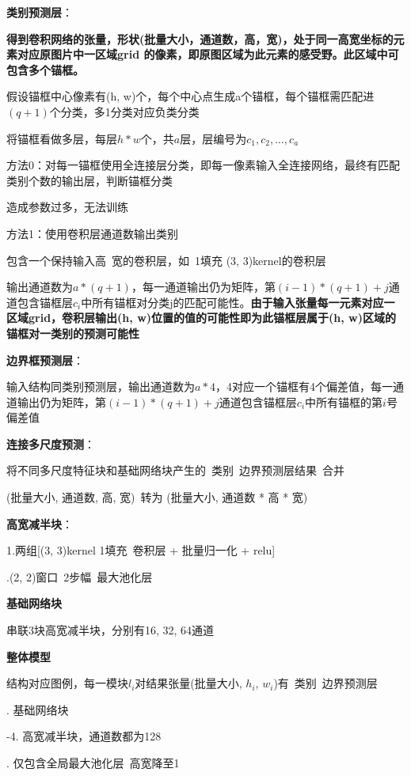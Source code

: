 \documentclass[UTF8]{ctexart}
\begin{document}
  \textbf{类别预测层}：

  \quad \textbf{得到卷积网络的张量，形状(批量大小，通道数，高，宽)，处于同一高宽坐标的元素对应原图片中一区域grid 的像素，即原图区域为此元素的感受野。此区域中可包含多个锚框。}
    
  \quad 假设锚框中心像素有(h, w)个，每个中心点生成a个锚框，每个锚框需匹配进$(q+1)$个分类，多1分类对应负类分类

  \quad \quad 将锚框看做多层，每层$h*w$个，共$a$层，层编号为$c_1, c_2, ..., c_a$

  \quad 方法0：对每一锚框使用全连接层分类，即每一像素输入全连接网络，最终有匹配类别个数的输出层，判断锚框分类

  \quad \quad 造成参数过多，无法训练

  \quad 方法1：使用卷积层通道数输出类别

  \quad \quad 包含一个保持输入高\ 宽的卷积层，如\ 1填充 (3, 3)kernel的卷积层

  \quad \quad 输出通道数为$a * (q+1)$，每一通道输出仍为矩阵，第$(i-1)*(q+1) + j$通道包含锚框层$c_i$中所有锚框对分类j的匹配可能性。\textbf{由于输入张量每一元素对应一区域grid，卷积层输出(h, w)位置的值的可能性即为此锚框层属于(h, w)区域的锚框对一类别的预测可能性}

  \textbf{边界框预测层}：

  \quad 输入结构同类别预测层，输出通道数为$a * 4$，4对应一个锚框有4个偏差值，每一通道输出仍为矩阵，第$(i-1)*(q+1) + j$通道包含锚框层$c_i$中所有锚框的第$i$号偏差值

  \textbf{连接多尺度预测}：

  \quad 将不同多尺度特征块和基础网络块产生的\ 类别\ 边界预测层结果\ 合并
  
  \quad (批量大小, 通道数, 高, 宽)\ 转为 (批量大小, 通道数 * 高 * 宽)
  
  \textbf{高宽减半块}：

  \quad 1.两组[(3, 3)kernel 1填充\ 卷积层 + 批量归一化 + relu]
  
  .(2, 2)窗口\ 2步幅\ 最大池化层

  \textbf{基础网络块}

  串联3块高宽减半块，分别有16, 32, 64通道

  \textbf{整体模型}
  
  \quad 结构对应图例，每一模块$l_i$对结果张量(批量大小, $h_i$, $w_i$)有\ 类别\ 边界预测层

  . 基础网络块

  -4. 高宽减半块，通道数都为128

  . 仅包含全局最大池化层\ 高宽降至1
\end{document}
